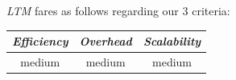 %
%
%
%
\emph{LTM} fares as follows regarding our $3$  criteria:
\begin{center}
{\footnotesize
\begin{tabular}{ccc}
\emph{Efficiency} & \emph{Overhead} & \emph{Scalability} \\
\hline
medium &
%
medium &
%
medium
\end{tabular}
}
\end{center}

